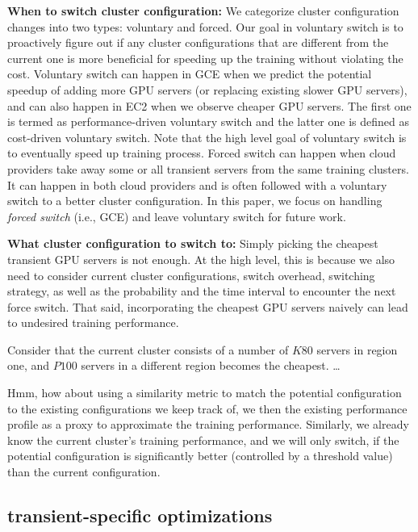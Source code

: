 \textbf{When to switch cluster configuration:} 
% 
We categorize cluster configuration changes into two types: voluntary and forced. Our goal in voluntary switch is to proactively figure out if any cluster configurations that are different from the current one is more beneficial for speeding up the training without violating the cost. Voluntary switch can happen in GCE when we predict the potential speedup of adding more GPU servers (or replacing existing slower GPU servers), and can also happen in EC2 when we observe cheaper GPU servers. The first one is termed as performance-driven voluntary switch and the latter one is defined as cost-driven voluntary switch. Note that the high level goal of voluntary switch is to eventually speed up training process. Forced switch can happen when cloud providers take away some or all transient servers from the same training clusters. It can happen in both cloud providers and is often followed with a voluntary switch to a better cluster configuration. In this paper, we focus on handling \emph{forced switch} (i.e., GCE) and leave voluntary switch for future work. 

\textbf{What cluster configuration to switch to:} 
% 
Simply picking the cheapest transient GPU servers is not enough. At the high level, this is because we also need to consider current cluster configurations, switch overhead, switching strategy, as well as the probability and the time interval to encounter the next force switch. That said, incorporating the cheapest GPU servers naively can lead to undesired training performance. 

Consider that the current cluster consists of a number of $K80$ servers in region one, and $P100$ servers in a different region becomes the cheapest. … 

Hmm, how about using a similarity metric to match the potential configuration to the existing configurations we keep track of, we then the existing performance profile as a proxy to approximate the training performance. Similarly, we already know the current cluster’s training performance, and we will only switch, if the potential configuration is significantly better (controlled by a threshold value) than the current configuration.  


\subsection{transient-specific optimizations}



